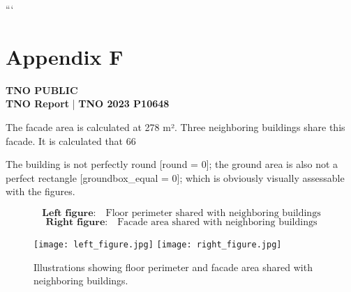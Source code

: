 \documentclass{article}
\begin{document}
```

\section*{Appendix F}

\textbf{TNO PUBLIC} \\
\textbf{TNO Report} | \textbf{TNO 2023 P10648}

The facade area is calculated at 278 m². Three neighboring buildings share this facade. It is calculated that 66%

The building is not perfectly round [round = 0]; the ground area is also not a perfect rectangle [groundbox\_equal = 0]; which is obviously visually assessable with the figures.

\[
\textbf{Left figure:} \quad \text{Floor perimeter shared with neighboring buildings}
\]
\[
\textbf{Right figure:} \quad \text{Facade area shared with neighboring buildings}
\]

\begin{figure}[h!]
\centering
\texttt{[image: left\_figure.jpg]}
\hfill
\texttt{[image: right\_figure.jpg]}
\caption{Illustrations showing floor perimeter and facade area shared with neighboring buildings.}
\end{figure}
\end{document}
